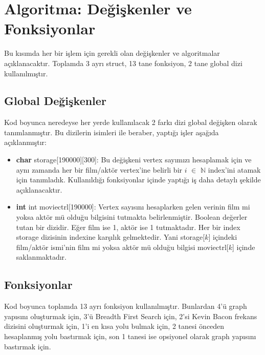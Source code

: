 \documentclass[11pt]{article}
\begin{document}
\section{Algoritma: Değişkenler ve Fonksiyonlar}
Bu kısımda her bir işlem için gerekli olan değişkenler ve algoritmalar açıklanacaktır. Toplamda 3 ayrı struct, 13 tane fonksiyon, 2 tane global dizi kullanılmıştır.
\subsection{Global Değişkenler}
\hspace*{1cm} Kod boyunca neredeyse her yerde kullanılacak 2 farkı dizi global değişken olarak tanımlanmıştır. Bu dizilerin isimleri ile beraber, yaptığı işler aşağıda açıklanmıştır:
\begin{itemize}
	\item \textbf{char} \textsf{storage[190000][300]:} Bu değişkeni vertex sayımızı hesaplamak için ve aynı zamanda her bir film/aktör vertex'ine belirli bir $i$ $\in$ $\mathbb{N}$ index'ini atamak için tanımladık. Kullanıldığı fonksiyonlar içinde yaptığı iş daha detaylı şekilde açıklanacaktır.
	\item \textbf{int} \textsf{int moviectrl[190000]:} Vertex sayısını hesaplarken gelen verinin film mi yoksa aktör mü olduğu bilgisini tutmakta belirlenmiştir. Boolean değerler tutan bir dizidir. Eğer film ise 1, aktör ise 1 tutmaktadır. Her bir index \textsf{storage} dizisinin indexine karşılık gelmektedir. Yani \textsf{storage[$k$]} içindeki film/aktör ismi'nin film mi yoksa aktör mü olduğu bilgisi \textsf{moviectrl[$k$]} içinde saklanmaktadır.
\end{itemize}
\subsection{Fonksiyonlar}
\hspace*{1cm} Kod boyunca toplamda 13 ayrı fonksiyon kullanılmıştır. Bunlardan 4'ü graph yapısını oluşturmak için, 3'ü Breadth First Search için, 2'si Kevin Bacon frekans dizisini oluşturmak için, 1'i en kısa yolu bulmak için, 2 tanesi önceden hesaplanmış yolu bastırmak için, son 1 tanesi ise opsiyonel olarak graph yapısını bastırmak için.
\end{document}
